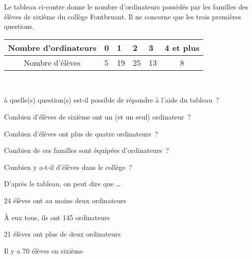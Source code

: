 

\begin{QCM}
  \begin{GroupeQCM}
  \begin{minipage}[c]{0.44\linewidth}
  Le tableau ci‑contre donne le nombre d'ordinateurs possédés par les familles des élèves de sixième du collège Fontbruant. Il ne concerne que les trois premières questions.
   \end{minipage} \hfill%
   \begin{minipage}[c]{0.52\linewidth}
   \begin{center}
    \begin{tabularx}{\linewidth}{|c|X|X|X|X|c|}
    \hline
    Nombre d'ordinateurs & 0 & 1 & 2 & 3 & 4 et plus \\\hline
    Nombre d'élèves & 5 & 19 & 25 & 13 & 8 \\\hline
  \end{tabularx}
   \end{center}
    \end{minipage}\\[1em]
    
    \begin{exercice}
      à quelle(s) question(s) est‑il possible de répondre à l'aide du tableau ?
      \begin{ChoixQCM}{4}
      \item Combien d'élèves de sixième ont un (et un seul) ordinateur ?
      \item Combien d'élèves ont plus de quatre ordinateurs ?
      \item Combien de ces familles sont équipées d'ordinateurs ?
      \item Combien y a‑t‑il d'élèves dans le collège ?
      \end{ChoixQCM}
\begin{corrige}
   \end{corrige}
    \end{exercice}
    
    
    \begin{exercice}
      D'après le tableau, on peut dire que \ldots
      \begin{ChoixQCM}{4}
      \item 24 élèves ont au moins deux ordinateurs
      \item À eux tous, ils ont 145 ordinateurs
      \item 21 élèves ont plus de deux ordinateurs
      \item Il y a 70 élèves en sixième
      \end{ChoixQCM}
\begin{corrige}
   \end{corrige}
    \end{exercice}
    

\end{GroupeQCM}
\end{QCM}
